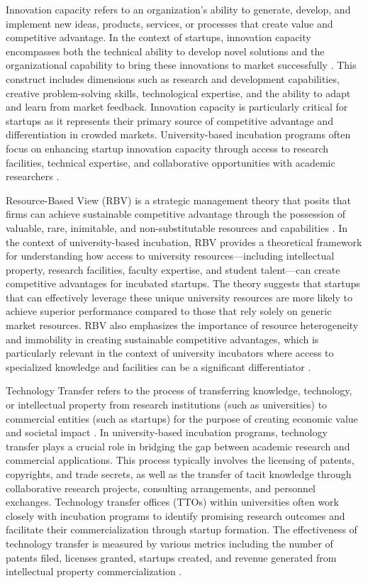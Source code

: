 \documentclass[../Main.tex]{subfiles}
\begin{document}
Innovation capacity refers to an organization's ability to generate, develop, and implement new ideas, products, services, or processes that create value and competitive advantage. In the context of startups, innovation capacity encompasses both the technical ability to develop novel solutions and the organizational capability to bring these innovations to market successfully \cite{lawson2001developing, hurley1998innovation}. This construct includes dimensions such as research and development capabilities, creative problem-solving skills, technological expertise, and the ability to adapt and learn from market feedback. Innovation capacity is particularly critical for startups as it represents their primary source of competitive advantage and differentiation in crowded markets. University-based incubation programs often focus on enhancing startup innovation capacity through access to research facilities, technical expertise, and collaborative opportunities with academic researchers \cite{grimaldi2005university}.

Resource-Based View (RBV) is a strategic management theory that posits that firms can achieve sustainable competitive advantage through the possession of valuable, rare, inimitable, and non-substitutable resources and capabilities \cite{barney1991firm, wernerfelt1984resource}. In the context of university-based incubation, RBV provides a theoretical framework for understanding how access to university resources—including intellectual property, research facilities, faculty expertise, and student talent—can create competitive advantages for incubated startups. The theory suggests that startups that can effectively leverage these unique university resources are more likely to achieve superior performance compared to those that rely solely on generic market resources. RBV also emphasizes the importance of resource heterogeneity and immobility in creating sustainable competitive advantages, which is particularly relevant in the context of university incubators where access to specialized knowledge and facilities can be a significant differentiator \cite{barney2001resource}.

Technology Transfer refers to the process of transferring knowledge, technology, or intellectual property from research institutions (such as universities) to commercial entities (such as startups) for the purpose of creating economic value and societal impact \cite{bozeman2000technology, siegel2003assessing}. In university-based incubation programs, technology transfer plays a crucial role in bridging the gap between academic research and commercial applications. This process typically involves the licensing of patents, copyrights, and trade secrets, as well as the transfer of tacit knowledge through collaborative research projects, consulting arrangements, and personnel exchanges. Technology transfer offices (TTOs) within universities often work closely with incubation programs to identify promising research outcomes and facilitate their commercialization through startup formation. The effectiveness of technology transfer is measured by various metrics including the number of patents filed, licenses granted, startups created, and revenue generated from intellectual property commercialization \cite{phan2005university}.
\end{document}
